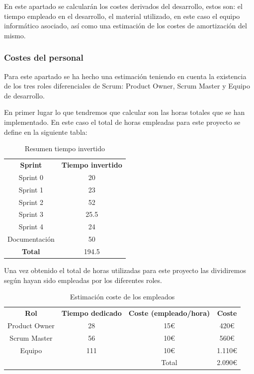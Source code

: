 En este apartado se calcularán los costes derivados del desarrollo, estos son: el tiempo empleado en el desarrollo, el material utilizado, en este caso el equipo informático asociado, así como una estimación de los costes de amortización del mismo.

\subsubsection{Costes del personal}

Para este apartado se ha hecho una estimación teniendo en cuenta la existencia de los tres roles diferenciales de Scrum: Product Owner, Scrum Master y Equipo de desarrollo.

En primer lugar lo que tendremos que calcular son las horas totales que se han implementado. En este caso el total de horas empleadas para este proyecto se define en la siguiente tabla:

\begin{table}[H]
	\begin{center}
		\begin{tabular}{| c | c |}
			\hline
			
			\textbf{Sprint} & \textbf{Tiempo invertido} \\
			Sprint 0 & 20 \\
			Sprint 1 & 23 \\
			Sprint 2 & 52 \\
			Sprint 3 & 25.5 \\
			Sprint 4 & 24 \\
			Documentación & 50 \\
			\textbf{Total} & 194.5 \\ \hline
		\end{tabular}
		\caption{Resumen tiempo invertido}

	\end{center}
\end{table} 

Una vez obtenido el total de horas utilizadas para este proyecto las dividiremos según hayan sido empleadas por los diferentes roles.

\begin{table}[H]
	\begin{center}
		\begin{tabular}{| c | c | c | c |}
			\hline
			
			\textbf{Rol} & \textbf{Tiempo dedicado} & \textbf{Coste (empleado/hora)} & \textbf{Coste} \\
			Product Owner & 28 & 15€ & 420€ \\
			Scrum Master & 56 & 10€ & 560€ \\
			Equipo & 111 & 10€ & 1.110€ \\
			 &  & Total & 2.090€ \\ \hline
		\end{tabular}
		\caption{Estimación coste de los empleados}
	\end{center}
\end{table}

